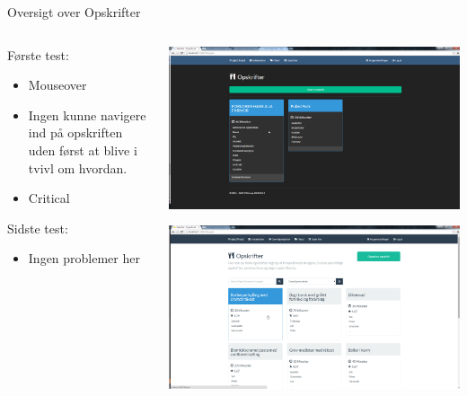 \begin{frame}{Oversigt over Opskrifter}
	
	\begin{minipage}[0.3\textheight]{\textwidth}
	\begin{columns}[T]
	\begin{column}{0.5\textwidth}
	
	Første test:
	\begin{itemize}
	\item Mouseover
	\item Ingen kunne navigere ind på opskriften uden først at blive i tvivl om hvordan.
	\item Critical
	
	\end{itemize}
	Sidste test:
	\begin{itemize}
		\item Ingen problemer her
	\end{itemize}
	
	\end{column}
	\begin{column}{0.5\textwidth}
	 \includegraphics[width=1\textwidth,height=1\textheight,keepaspectratio, trim={1cm 0 0 16mm}, clip]{images/Screenshots/RecipeOld.png}
	 
	 \vspace{2 mm}
	  
	  \includegraphics[width=1\textwidth,height=1\textheight,keepaspectratio, trim={1cm 0 0 16mm}, clip]{images/Screenshots//Recipe.png}
	\end{column}
	\end{columns}
	

  \end{minipage}
  
  	
\end{frame}

